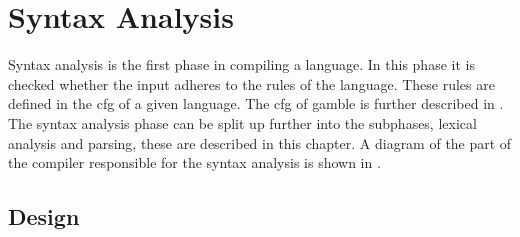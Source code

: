 \chapter{Syntax Analysis}\label{sec:syntaxAnalysis}
Syntax analysis is the first phase in compiling a language.
In this phase it is checked whether the input adheres to the rules of the language.
These rules are defined in the \acrshort{cfg} of a given language.
The \acrshort{cfg} of \gls{gamble} is further described in .
The syntax analysis phase can be split up further into the subphases, lexical analysis and parsing, these are described in this chapter.
A diagram of the part of the compiler responsible for the syntax analysis is shown in .


\section{Design}








